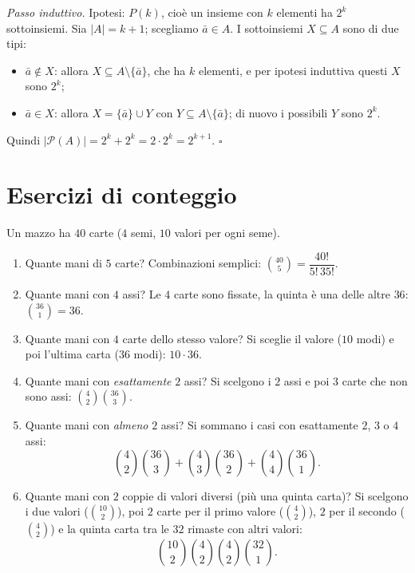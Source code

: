 \documentclass[11pt,a4paper]{article}
\begin{document}
\emph{Passo induttivo.} Ipotesi: $P(k)$, cioè un insieme con $k$ elementi ha $2^k$ sottoinsiemi. Sia $|A| = k + 1$; scegliamo $\bar a \in A$. I sottoinsiemi $X \subseteq A$ sono di due tipi:
\begin{itemize}
    \item $\bar a \notin X$: allora $X \subseteq A \setminus \{\bar a\}$, che ha $k$ elementi, e per ipotesi induttiva questi $X$ sono $2^k$;
    \item $\bar a \in X$: allora $X = \{\bar a\} \cup Y$ con $Y \subseteq A \setminus \{\bar a\}$; di nuovo i possibili $Y$ sono $2^k$.
\end{itemize}
Quindi $|\mathcal{P}(A)| = 2^k + 2^k = 2 \cdot 2^k = 2^{k+1}$. \hfill $\square$

\section{Esercizi di conteggio}

\begin{esempio}[Carte]
Un mazzo ha $40$ carte ($4$ semi, $10$ valori per ogni seme).
\begin{enumerate}
    \item Quante mani di $5$ carte? Combinazioni semplici: $\binom{40}{5} = \dfrac{40!}{5!\,35!}$.
    \item Quante mani con $4$ assi? Le $4$ carte sono fissate, la quinta è una delle altre $36$: $\binom{36}{1} = 36$.
    \item Quante mani con $4$ carte dello stesso valore? Si sceglie il valore ($10$ modi) e poi l'ultima carta ($36$ modi): $10 \cdot 36$.
    \item Quante mani con \emph{esattamente} $2$ assi? Si scelgono i $2$ assi e poi $3$ carte che non sono assi: $\binom{4}{2}\binom{36}{3}$.
    \item Quante mani con \emph{almeno} $2$ assi? Si sommano i casi con esattamente $2$, $3$ o $4$ assi:
    \[
    \binom{4}{2}\binom{36}{3} + \binom{4}{3}\binom{36}{2} + \binom{4}{4}\binom{36}{1}.
    \]
    \item Quante mani con $2$ coppie di valori diversi (più una quinta carta)? Si scelgono i due valori ($\binom{10}{2}$), poi $2$ carte per il primo valore ($\binom{4}{2}$), $2$ per il secondo ($\binom{4}{2}$) e la quinta carta tra le $32$ rimaste con altri valori:
    \[
    \binom{10}{2}\binom{4}{2}\binom{4}{2}\binom{32}{1}.
    \]
\end{enumerate}
\end{esempio}
\end{document}
